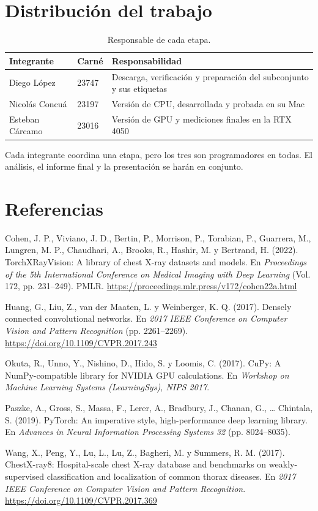 \documentclass[11pt,letterpaper]{article}
\begin{document}
\section{Distribución del trabajo}

\begin{table}[h]
\centering
\caption{Responsable de cada etapa.}
\begin{tabularx}{\linewidth}{|l|l|X|}
\hline
Integrante & Carné & Responsabilidad \\ \hline
Diego López & 23747 & Descarga, verificación y preparación del subconjunto y sus etiquetas \\ \hline
Nicolás Concuá & 23197 & Versión de CPU, desarrollada y probada en su Mac \\ \hline
Esteban Cárcamo & 23016 & Versión de GPU y mediciones finales en la RTX 4050 \\ \hline
\end{tabularx}
\end{table}

Cada integrante coordina una etapa, pero los tres son programadores en todas. El análisis, el informe final y la presentación se harán en conjunto.

\clearpage
\section*{Referencias}
{\setlength{\parindent}{-1.25em}\setlength{\leftskip}{1.25em}\setlength{\parskip}{3pt}

Cohen, J. P., Viviano, J. D., Bertin, P., Morrison, P., Torabian, P., Guarrera, M., Lungren, M. P., Chaudhari, A., Brooks, R., Hashir, M. y Bertrand, H. (2022). TorchXRayVision: A library of chest X-ray datasets and models. En \textit{Proceedings of the 5th International Conference on Medical Imaging with Deep Learning} (Vol. 172, pp. 231--249). PMLR. \url{https://proceedings.mlr.press/v172/cohen22a.html}

Huang, G., Liu, Z., van der Maaten, L. y Weinberger, K. Q. (2017). Densely connected convolutional networks. En \textit{2017 IEEE Conference on Computer Vision and Pattern Recognition} (pp. 2261--2269). \url{https://doi.org/10.1109/CVPR.2017.243}

Okuta, R., Unno, Y., Nishino, D., Hido, S. y Loomis, C. (2017). CuPy: A NumPy-compatible library for NVIDIA GPU calculations. En \textit{Workshop on Machine Learning Systems (LearningSys), NIPS 2017}.

Paszke, A., Gross, S., Massa, F., Lerer, A., Bradbury, J., Chanan, G., \ldots{} Chintala, S. (2019). PyTorch: An imperative style, high-performance deep learning library. En \textit{Advances in Neural Information Processing Systems 32} (pp. 8024--8035).


Wang, X., Peng, Y., Lu, L., Lu, Z., Bagheri, M. y Summers, R. M. (2017). ChestX-ray8: Hospital-scale chest X-ray database and benchmarks on weakly-supervised classification and localization of common thorax diseases. En \textit{2017 IEEE Conference on Computer Vision and Pattern Recognition}. \url{https://doi.org/10.1109/CVPR.2017.369}
\par}
\end{document}
